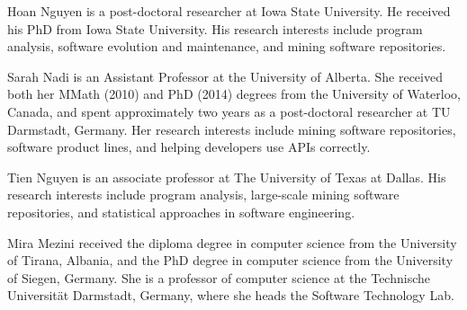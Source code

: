 \documentclass[10pt,journal,compsoc]{IEEEtran}
\begin{document}
\begin{IEEEbiography}
{Hoan Nguyen}
is a post-doctoral researcher at Iowa State University. He received his PhD from Iowa State University. His research interests include program analysis, software evolution and maintenance, and mining software repositories.
\end{IEEEbiography}

\begin{IEEEbiography}{Sarah Nadi}
is an Assistant Professor at the University of Alberta. She received both her MMath (2010) and PhD (2014) degrees from the University of Waterloo, Canada, and spent approximately two years as a post-doctoral researcher at TU Darmstadt, Germany. Her research interests include mining software repositories, software product lines, and helping developers use APIs correctly. 
\end{IEEEbiography}

\begin{IEEEbiography}
{Tien Nguyen}
 is an associate professor at The University of Texas at Dallas. His research interests include program analysis, large-scale mining software repositories, and statistical approaches in software engineering. 
 \end{IEEEbiography}

\begin{IEEEbiography}{Mira Mezini}
received the diploma degree in computer science from the
  University of Tirana, Albania, and the PhD degree in computer
  science from the University of Siegen, Germany.  She is a professor
  of computer science at the Tech\-ni\-sche Universit\"{a}t Darmstadt,
  Germany, where she heads the Software Technology Lab.
\end{IEEEbiography}





\end{document}
